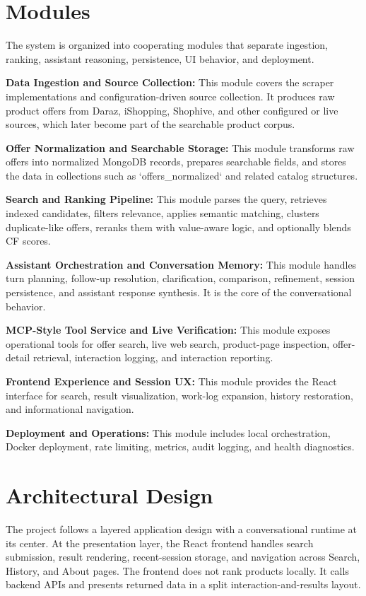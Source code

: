 \documentclass[12pt,a4paper,oneside]{report}
\begin{document}
\section{Modules}
The system is organized into cooperating modules that separate ingestion, ranking, assistant reasoning, persistence, UI behavior, and deployment.

\textbf{Data Ingestion and Source Collection:} This module covers the scraper implementations and configuration-driven source collection. It produces raw product offers from Daraz, iShopping, Shophive, and other configured or live sources, which later become part of the searchable product corpus.

\textbf{Offer Normalization and Searchable Storage:} This module transforms raw offers into normalized MongoDB records, prepares searchable fields, and stores the data in collections such as `offers\_normalized` and related catalog structures.

\textbf{Search and Ranking Pipeline:} This module parses the query, retrieves indexed candidates, filters relevance, applies semantic matching, clusters duplicate-like offers, reranks them with value-aware logic, and optionally blends CF scores.

\textbf{Assistant Orchestration and Conversation Memory:} This module handles turn planning, follow-up resolution, clarification, comparison, refinement, session persistence, and assistant response synthesis. It is the core of the conversational behavior.

\textbf{MCP-Style Tool Service and Live Verification:} This module exposes operational tools for offer search, live web search, product-page inspection, offer-detail retrieval, interaction logging, and interaction reporting.

\textbf{Frontend Experience and Session UX:} This module provides the React interface for search, result visualization, work-log expansion, history restoration, and informational navigation.

\textbf{Deployment and Operations:} This module includes local orchestration, Docker deployment, rate limiting, metrics, audit logging, and health diagnostics.

\section{Architectural Design}
The project follows a layered application design with a conversational runtime at its center. At the presentation layer, the React frontend handles search submission, result rendering, recent-session storage, and navigation across Search, History, and About pages. The frontend does not rank products locally. It calls backend APIs and presents returned data in a split interaction-and-results layout.
\end{document}
